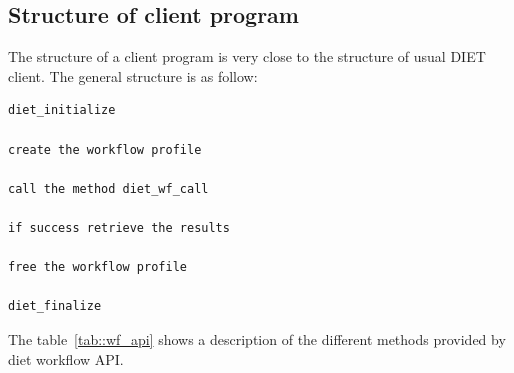 \subsection{Structure of client program}
\label{sec:client_prg}

The structure of a client program is very close to the structure of
usual DIET client. The general structure is as follow:

\begin{verbatim}
diet_initialize

create the workflow profile

call the method diet_wf_call

if success retrieve the results

free the workflow profile

diet_finalize
\end{verbatim}

The table~\ref{tab::wf_api} shows a description of the different
methods provided by diet workflow API. 

